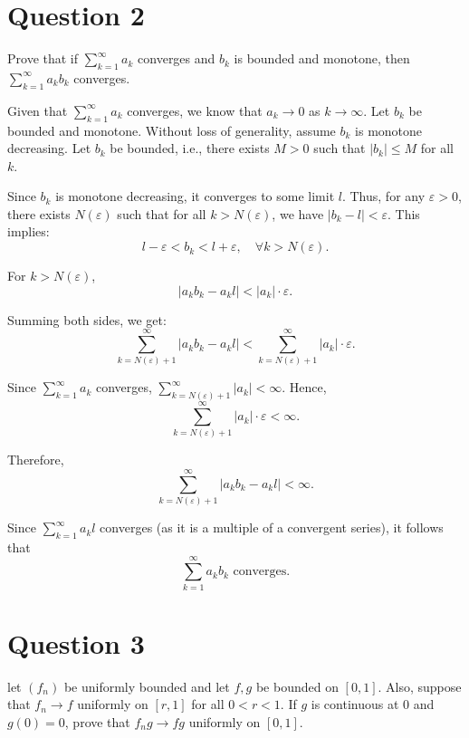 \documentclass{article}
\begin{document}
\section{Question 2}

Prove that if $\sum_{k=1}^{\infty} a_k$ converges and $b_k$ is bounded and monotone, then $\sum_{k=1}^{\infty} a_k b_k$ converges.

\begin{proofbox}
    Given that $\sum_{k=1}^{\infty} a_k$ converges, we know that $a_k \to 0$ as $k \to \infty$. Let $b_k$ be bounded and monotone. Without loss of generality, assume $b_k$ is monotone decreasing. Let $b_k$ be bounded, i.e., there exists $M > 0$ such that $|b_k| \leq M$ for all $k$.

Since $b_k$ is monotone decreasing, it converges to some limit $l$. Thus, for any $\varepsilon > 0$, there exists $N(\varepsilon)$ such that for all $k > N(\varepsilon)$, we have $|b_k - l| < \varepsilon$. This implies:
\[
l - \varepsilon < b_k < l + \varepsilon, \quad \forall k > N(\varepsilon).
\]

For $k > N(\varepsilon)$,
\[
|a_k b_k - a_k l| < |a_k| \cdot \varepsilon.
\]

Summing both sides, we get:
\[
\sum_{k=N(\varepsilon)+1}^{\infty} |a_k b_k - a_k l| < \sum_{k=N(\varepsilon)+1}^{\infty} |a_k| \cdot \varepsilon.
\]

Since $\sum_{k=1}^{\infty} a_k$ converges, $\sum_{k=N(\varepsilon)+1}^{\infty} |a_k| < \infty$. Hence,
\[
\sum_{k=N(\varepsilon)+1}^{\infty} |a_k| \cdot \varepsilon < \infty.
\]

Therefore,
\[
\sum_{k=N(\varepsilon)+1}^{\infty} |a_k b_k - a_k l| < \infty.
\]

Since $\sum_{k=1}^{\infty} a_k l$ converges (as it is a multiple of a convergent series), it follows that
\[
\sum_{k=1}^{\infty} a_k b_k \text{ converges}.
\]
\end{proofbox}

\section{Question 3}
let $(f_n)$ be uniformly bounded and let $f, g$ be bounded on $[0, 1]$. Also, suppose that $f_n \to f$ uniformly on $[r, 1]$ for all $0 < r < 1$. If $g$ is continuous at 0 and $g(0) = 0$, prove that $f_n g \to f g$ uniformly on $[0, 1]$.
\end{document}
